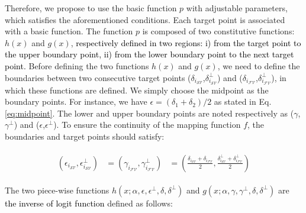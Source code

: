 Therefore, we propose to use the basic function $p$ with adjustable parameters, which satisfies the aforementioned conditions. %
Each target point is associated with a basic function. 
The function $p$ is composed of two constitutive functions: $h(x)$ and $g(x)$, \textcolor{black}{respectively defined in two regions: i) from the target point to the upper boundary point, ii) from the lower boundary point to the next target point. }%
Before defining the two functions $h(x)$ and $g(x)$, we need to define the boundaries between two consecutive target points  ($\delta_{i_{{\mathcal{SV}}}}$,$\delta^{\perp}_{i_{{\mathcal{SV}}}}$) and ($\delta_{i_{{\mathcal{FV}}}}$,$\delta^{\perp}_{i_{{\mathcal{FV}}}}$), in which these functions are defined.%
We simply choose the midpoint as the boundary points. For instance, we have $\epsilon=(\delta_1+\delta_2)/2$ %
as stated in Eq. \ref{eq:midpoint}.
The lower and upper boundary points are noted respectively as ($\gamma$,$\gamma^{\perp}$) and ($\epsilon$,$\epsilon^{\perp}$). To ensure the continuity of the mapping function $f$, the boundaries and target points should satisfy:
 

\begin{align}
\label{eq:midpoint}
\begin{aligned}
(\epsilon_{i_{{\mathcal{SV}}}},\epsilon^{\perp}_{i_{{\mathcal{SV}}}}) &=
(\gamma_{i_{{\mathcal{FV}}}},\gamma^{\perp}_{i_{{\mathcal{FV}}}}) &=
(\frac{\delta_{i_{{\mathcal{SV}}}} + \delta_{i_{{\mathcal{FV}}}}}{2}, \frac{\delta^{\perp}_{i_{{\mathcal{SV}}}} + \delta^{\perp}_{i_{{\mathcal{FV}}}}}{2})
\end{aligned}
\end{align}

The two piece-wise functions $h(x;\alpha,\epsilon,\epsilon^{\perp},\delta,\delta^{\perp})$ and $g(x;\alpha,\gamma,\gamma^{\perp},\delta,\delta^{\perp})$ are \textcolor{black}{the inverse of logit function} defined as follows:%

